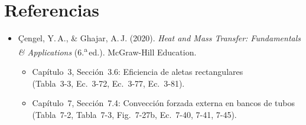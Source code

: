 \documentclass[12pt, a4paper]{article}
\begin{document}
\section{Referencias}

\begin{itemize}
    \item Çengel, Y.\,A., \& Ghajar, A.\,J. (2020). \textit{Heat and Mass Transfer:
    Fundamentals \& Applications} (6.\textsuperscript{a}\,ed.). McGraw-Hill Education.
    \begin{itemize}
        \item Capítulo~3, Sección~3.6: Eficiencia de aletas rectangulares\\
              (Tabla~3-3, Ec.~3-72, Ec.~3-77, Ec.~3-81).
        \item Capítulo~7, Sección~7.4: Convección forzada externa en bancos de tubos\\
              (Tabla~7-2, Tabla~7-3, Fig.~7-27b, Ec.~7-40, 7-41, 7-45).
    \end{itemize}
\end{itemize}
\end{document}
